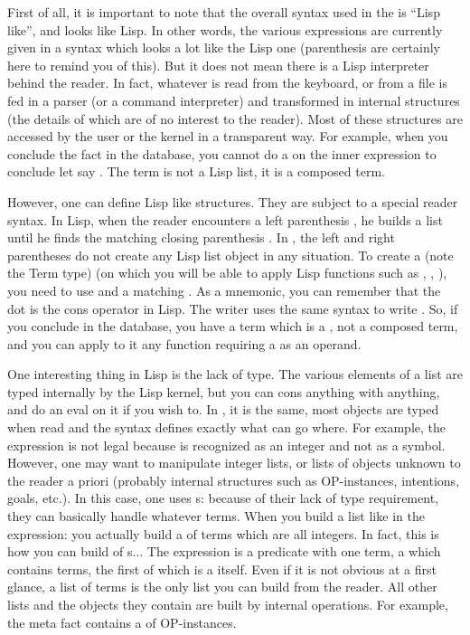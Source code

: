 First of all, it is important to note that the overall syntax used in the
\COPRSDE{} is ``Lisp like'', and looks like Lisp. In other words, the
various expressions are currently given in a syntax which looks a lot like the
Lisp one (parenthesis are certainly here to remind you of this). But it does
not mean there is a Lisp interpreter behind the reader. In fact, whatever is
read from the keyboard, or from a file is fed in a parser (or a command
interpreter) and transformed in internal structures (the details of which are
of no interest to the reader). Most of these structures are accessed by the
user or the kernel in a transparent way. For example, when you conclude the
fact  in the database, you cannot do a  on the
inner expression  to conclude let say . The
term  is not a Lisp list, it is a composed term.

However, one can define Lisp like structures. They are subject to a special
reader syntax. In Lisp, when the reader encounters a left parenthesis \samp{(},
he builds a list until he finds the matching closing parenthesis \samp{)}. In
\COPRS{}, the left and right parentheses do not create any Lisp list object in
any situation. To create a  (note the Term type) (on which you
will be able to apply Lisp functions such as , ,
), you need to use  and a matching . As a
mnemonic, you can remember that the dot   is the cons operator in
Lisp. The \COPRS{} writer uses the same syntax to write . So, if
you conclude  in the database, you have a
 term which is a , not a composed term, and
you can apply to it any function requiring a  as an operand.

One interesting thing in Lisp is the lack of type. The various elements of a
list are typed internally by the Lisp kernel, but you can cons anything with
anything, and do an eval on it if you wish to. In \COPRS{}, it is the same, most
objects are typed when read and the syntax defines exactly what can go where.
For example, the expression  is not legal because
 is recognized as an integer and not as a symbol. However, one may want
to manipulate integer lists, or lists of objects unknown to the reader a priori
(probably internal structures such as OP-instances, intentions, goals, etc.). In
this case, one uses s: because of their lack of type
requirement, they can basically handle whatever terms.  When you build a list
like in the expression:  you actually build a
 of terms which are all integers. In fact, this is how you can
build  of s... The expression  is a predicate with one term, a 
which contains terms, the first of which is a  itself. Even if
it is not obvious at a first glance, a list of terms is the only list you can
build from the reader.  All other lists and the objects they contain are built
by internal operations.  For example, the  meta fact contains a
 of OP-instances.

